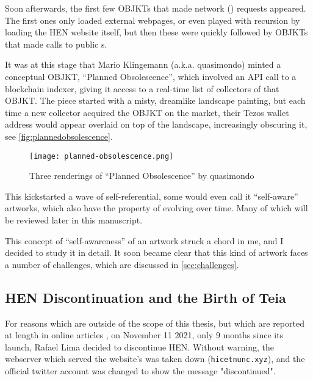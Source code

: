 Soon afterwards, the first few OBJKTs that made network () requests appeared. The first ones only loaded external webpages, or even played with recursion by loading the HEN website itself, but then these were quickly followed by OBJKTs that made calls to public s.

It was at this stage that Mario Klingemann (a.k.a. quasimondo) minted a conceptual OBJKT, ``Planned Obsolescence'', which involved an API call to a blockchain indexer, giving it access to a real-time list of collectors of that OBJKT. The piece started with a misty, dreamlike landscape painting, but each time a new collector acquired the OBJKT on the market, their Tezos wallet address would appear overlaid on top of the landscape, increasingly obscuring it, see \autoref{fig:plannedobsolescence}.


\begin{figure}[H]
    \centering
    \texttt{[image: planned-obsolescence.png]}
    \caption[``Planned Obsolescence'' by quasimondo]{Three renderings of ``Planned Obsolescence'' by quasimondo}
    \label{fig:plannedobsolescence}
\end{figure}


This kickstarted a wave of self-referential, some would even call it ``self-aware'' artworks, which also have the property of evolving over time. Many of which will be reviewed later in this manuscript.

This concept of ``self-awareness'' of an artwork struck a chord in me, and I decided to study it in detail. It soon became clear that this kind of artwork faces a number of challenges, which are discussed in \autoref{sec:challenges}.


\subsection*{HEN Discontinuation and the Birth of Teia}
\label{sub:teia}

For reasons which are outside of the scope of this thesis, but which are reported at length in online articles \cite{straeubigHENTimelineHentimeline2024} \cite{siqueiraHicNuncStory2021a} \cite{tezosHistoryTeiaArt2022} \cite{smithHicNuncPart2022}, on November 11 2021, only 9 months since its launch, Rafael Lima decided to discontinue HEN. Without warning, the webserver which served the website's  was taken down (\texttt{hicetnunc.xyz}), and the official twitter account was changed to show the message "discontinued".

